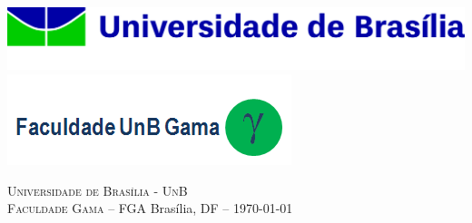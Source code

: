 
\begin{titlepage}

\centering
\hfill
\includegraphics[keepaspectratio,scale=0.05]{images/unb.png}%
\hfill
\includegraphics[keepaspectratio,scale=0.5]{images/fga.png}
\hfill

\scshape
\normalfont
\vspace{2cm}

\vspace*{\fill}


\huge{\ver}

\vspace{0.03\textheight}
\vspace{0.01\textheight}

{\Huge{\hell}}


\vspace*{\fill}

\vspace{0.3\textheight}
\vbox{\scshape
	\vbox{\large Universidade de Brasília - UnB\\Faculdade Gama – FGA}
}
\vspace{0.25cm}
\vbox{\normalsize Brasília, DF – \today}
\end{titlepage}

